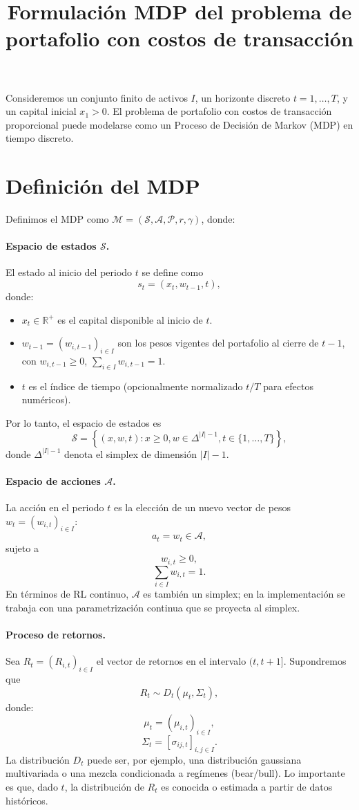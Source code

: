 \documentclass[12pt]{article}
\title{Formulación MDP del problema de portafolio con costos de transacción}
\author{}
\date{}
\begin{document}
\maketitle

Consideremos un conjunto finito de activos $I$, un horizonte discreto $t = 1, \dots, T$, y un capital inicial $x_1 > 0$. El problema de portafolio con costos de transacción proporcional puede modelarse como un Proceso de Decisión de Markov (MDP) en tiempo discreto.

\section{Definición del MDP}
Definimos el MDP como $\mathcal{M} = (\mathcal{S}, \mathcal{A}, \mathcal{P}, r, \gamma)$, donde:

\paragraph{Espacio de estados $\mathcal{S}$.} El estado al inicio del periodo $t$ se define como
$$s_t = (x_t, w_{t-1}, t),$$
donde:
\begin{itemize}
    \item $x_t \in \mathbb{R}^+$ es el capital disponible al inicio de $t$.
    \item $w_{t-1} = (w_{i,t-1})_{i \in I}$ son los pesos vigentes del portafolio al cierre de $t - 1$, con $w_{i,t-1} \geq 0$, $\sum_{i \in I} w_{i,t-1} = 1$.
    \item $t$ es el índice de tiempo (opcionalmente normalizado $t/T$ para efectos numéricos).
\end{itemize}
Por lo tanto, el espacio de estados es
$$\mathcal{S} = \left\{(x, w, t) : x \geq 0, w \in \Delta^{|I|-1}, t \in \{1, \dots, T\}\right\},$$
donde $\Delta^{|I|-1}$ denota el simplex de dimensión $|I| - 1$.

\paragraph{Espacio de acciones $\mathcal{A}$.} La acción en el periodo $t$ es la elección de un nuevo vector de pesos $w_t = (w_{i,t})_{i \in I}$:
$$a_t = w_t \in \mathcal{A},$$
sujeto a
$$w_{i,t} \geq 0,$$
$$\sum_{i \in I} w_{i,t} = 1.$$
En términos de RL continuo, $\mathcal{A}$ es también un simplex; en la implementación se trabaja con una parametrización continua que se proyecta al simplex.

\paragraph{Proceso de retornos.} Sea $R_t = (R_{i,t})_{i \in I}$ el vector de retornos en el intervalo $(t, t + 1]$. Supondremos que
$$R_t \sim D_t(\mu_t, \Sigma_t),$$
donde:
$$\mu_t = (\mu_{i,t})_{i \in I},$$
$$\Sigma_t = [\sigma_{ij,t}]_{i,j \in I}.$$
La distribución $D_t$ puede ser, por ejemplo, una distribución gaussiana multivariada o una mezcla condicionada a regímenes (bear/bull). Lo importante es que, dado $t$, la distribución de $R_t$ es conocida o estimada a partir de datos históricos.
\end{document}
